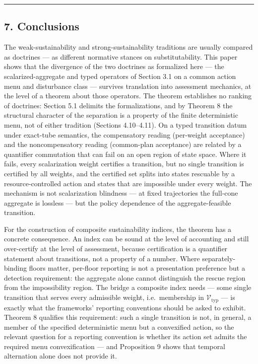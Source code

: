 \documentclass[11pt]{article}
\begin{document}
\begin{center}\rule{0.5\linewidth}{0.5pt}\end{center}

\subsection{7. Conclusions}\label{conclusions}

The weak-sustainability and strong-sustainability traditions are usually
compared as doctrines --- as different normative stances on
substitutability. This paper shows that the divergence of the two
doctrines as formalized here --- the scalarized-aggregate and typed
operators of Section 3.1 on a common action menu and disturbance class
--- survives translation into assessment mechanics, at the level of a
theorem about those operators. The theorem establishes no ranking of doctrines: Section 5.1 delimits the formalizations, and by Theorem 8 the structural character of the separation is a property of the finite deterministic menu, not of either tradition (Sections 4.10--4.11). On a typed transition datum under exact-tube semantics, the
compensatory reading (per-weight acceptance) and the noncompensatory
reading (common-plan acceptance) are related by a quantifier commutation
that can fail on an open region of state space. Where it fails, every
scalarization weight certifies a transition, but no single transition is
certified by all weights, and the certified set splits into states
rescuable by a resource-controlled action and states that are impossible
under every weight. The mechanism is not scalarization blindness --- at
fixed trajectories the full-cone aggregate is lossless --- but the
policy dependence of the aggregate-feasible transition.

For the construction of composite sustainability indices, the theorem
has a concrete consequence. An index can be sound at the level of
accounting and still over-certify at the level of assessment, because
certification is a quantifier statement about transitions, not a
property of a number. Where separately-binding floors matter, per-floor
reporting is not a presentation preference but a detection requirement:
the aggregate alone cannot distinguish the rescue region from the
impossibility region. The bridge a composite index needs --- some single
transition that serves every admissible weight, i.e.~membership in
\(\mathcal{V}_{\mathrm{typ}}\) --- is exactly what the frameworks'
reporting conventions should be asked to exhibit. Theorem 8 qualifies this requirement: such a single transition is not, in general, a member of the specified deterministic menu but a convexified action, so the relevant question for a reporting convention is whether its action set admits the required menu convexification --- and Proposition 9 shows that temporal alternation alone does not provide it.
\end{document}
